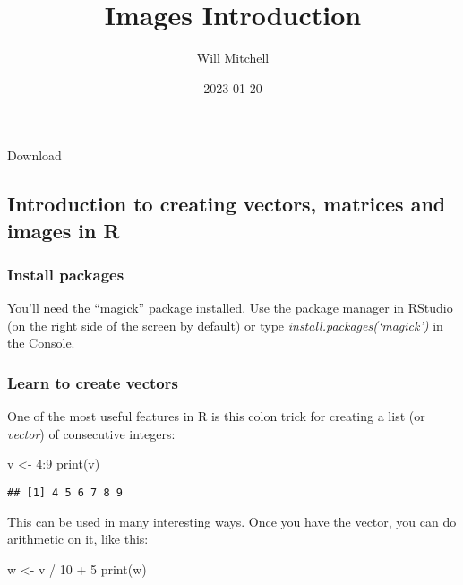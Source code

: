 \documentclass[
]{article}
\title{Images Introduction}
\author{Will Mitchell}
\date{2023-01-20}
\newenvironment{Shaded}{\begin{snugshade}}{\end{snugshade}}
\newcommand{\DecValTok}[1]{\textcolor[rgb]{0.00,0.00,0.81}{#1}}
\newcommand{\FunctionTok}[1]{\textcolor[rgb]{0.00,0.00,0.00}{#1}}
\newcommand{\NormalTok}[1]{#1}
\newcommand{\OtherTok}[1]{\textcolor[rgb]{0.56,0.35,0.01}{#1}}
\newcommand{\SpecialCharTok}[1]{\textcolor[rgb]{0.00,0.00,0.00}{#1}}
\begin{document}
\maketitle

{} Download

\hypertarget{introduction-to-creating-vectors-matrices-and-images-in-r}{%
\subsection{Introduction to creating vectors, matrices and images in
R}\label{introduction-to-creating-vectors-matrices-and-images-in-r}}

\hypertarget{install-packages}{%
\subsubsection{Install packages}\label{install-packages}}

You'll need the ``magick'' package installed. Use the package manager in
RStudio (on the right side of the screen by default) or type
\emph{install.packages(`magick')} in the Console.

\hypertarget{learn-to-create-vectors}{%
\subsubsection{Learn to create vectors}\label{learn-to-create-vectors}}

One of the most useful features in R is this colon trick for creating a
list (or \emph{vector}) of consecutive integers:

\begin{Shaded}
\begin{Highlighting}[]
\NormalTok{v }\OtherTok{\textless{}{-}} \DecValTok{4}\SpecialCharTok{:}\DecValTok{9}
\FunctionTok{print}\NormalTok{(v)}
\end{Highlighting}
\end{Shaded}

\begin{verbatim}
## [1] 4 5 6 7 8 9
\end{verbatim}

This can be used in many interesting ways. Once you have the vector, you
can do arithmetic on it, like this:

\begin{Shaded}
\begin{Highlighting}[]
\NormalTok{w }\OtherTok{\textless{}{-}}\NormalTok{ v }\SpecialCharTok{/} \DecValTok{10} \SpecialCharTok{+} \DecValTok{5}
\FunctionTok{print}\NormalTok{(w)}
\end{Highlighting}
\end{Shaded}
\end{document}
